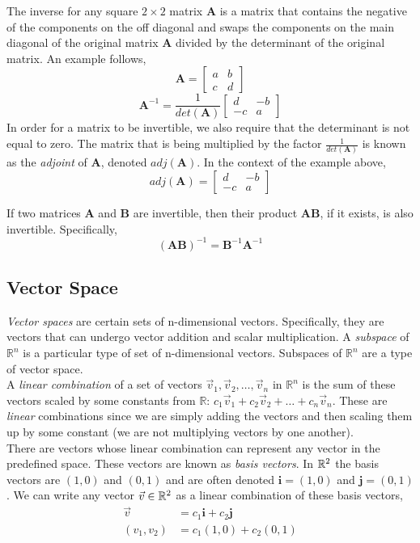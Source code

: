 \documentclass[12pt]{article}
\begin{document}
The inverse for any square $2\times2$ matrix $\mathbf{A}$ is a matrix that contains the negative of the components on the off diagonal and swaps the components on the main diagonal of the original matrix $\mathbf{A}$ divided by the determinant of the original matrix. An example follows,
\[
\mathbf{A}=
\begin{bmatrix}
a & b \\
c & d
\end{bmatrix}
\]
\[
\mathbf{A}^{-1}=
\frac{1}{det(\mathbf{A})}
\begin{bmatrix}
d & -b \\
-c & a
\end{bmatrix}
\]
In order for a matrix to be invertible, we also require that the determinant is not equal to zero. The matrix that is being multiplied by the factor $\frac{1}{det(\mathbf{A})}$ is known as the \emph{adjoint} of $\mathbf{A}$, denoted $adj(\mathbf{A})$. In the context of the example above,
\[
adj(\mathbf{A}) = 
\begin{bmatrix}
d & -b \\
-c & a
\end{bmatrix}
\]

If two matrices $\mathbf{A}$ and $\mathbf{B}$ are invertible, then their product $\mathbf{AB}$, if it exists, is also invertible. Specifically,
\[
(\mathbf{AB})^{-1} = \mathbf{B}^{-1}\mathbf{A}^{-1}
\]

\subsection{Vector Space}
\emph{Vector spaces} are certain sets of n-dimensional vectors. Specifically, they are vectors that can undergo vector addition and scalar multiplication. A \emph{subspace} of $\mathbb{R}^n$ is a particular type of set of n-dimensional vectors. Subspaces of $\mathbb{R}^n$ are a type of vector space. \\

A \emph{linear combination} of a set of vectors $\vec{v}_1,\vec{v}_2,\ldots,\vec{v}_n$ in $\mathbb{R}^n$ is the sum of these vectors scaled by some constants from $\mathbb{R}$: $c_1\vec{v}_1+c_2\vec{v}_2+\ldots+c_n\vec{v}_n$. These are \emph{linear} combinations since we are simply adding the vectors and then scaling them up by some constant (we are not multiplying vectors by one another). \\

There are vectors whose linear combination can represent any vector in the predefined space. These vectors are known as \emph{basis vectors}. In $\mathbb{R}^2$ the basis vectors are $(1,0)$ and $(0,1)$ and are often denoted $\mathbf{i}=(1,0)$ and $\mathbf{j}=(0,1)$. We can write any vector $\vec{v}\in\mathbb{R}^2$ as a linear combination of these basis vectors,
\begin{align*}
\vec{v} &= c_1\mathbf{i} + c_2\mathbf{j} \\
(v_1,v_2) &= c_1(1,0) + c_2(0,1)
\end{align*}
\end{document}

